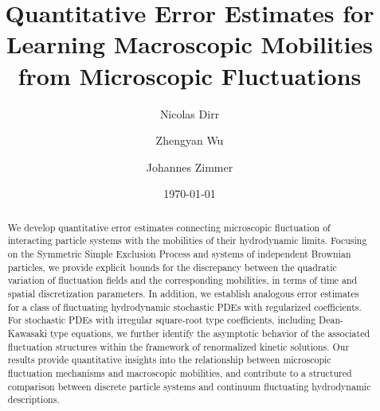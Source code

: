 \documentclass[UTF-8,reqno]{amsart}
\numberwithin{equation}{section}
\newenvironment{nouppercase}{%
  \let\uppercase\relax%
  \renewcommand{\uppercasenonmath}[1]{}}{}
\begin{document}
\title[Quantitative Error Estimates for Fluctuation Fields]
{\LARGE Quantitative Error Estimates for Learning Macroscopic Mobilities from Microscopic Fluctuations} 



\author[Nicolas Dirr]{\large Nicolas Dirr}
\address[N. Dirr]{Cardiff School of Mathematics, Cardiff University, Cardiff, UK}

\author[Zhengyan Wu]{\large Zhengyan Wu}
\address[Z. Wu]{Department of Mathematics, Technische Universit\"at M\"unchen, Boltzmannstr. 3, 85748 Garching, Germany}


\author[Johannes Zimmer]{\large Johannes Zimmer}
\address[J. Zimmer]{Department of Mathematics, Technische Universit\"at M\"unchen, Boltzmannstr. 3, 85748 Garching, Germany}





\begin{abstract}
We develop quantitative error estimates connecting microscopic fluctuation of interacting particle systems with the mobilities of their hydrodynamic limits. Focusing on the Symmetric Simple Exclusion Process and systems of independent Brownian particles, we provide explicit bounds for the discrepancy between the quadratic variation of fluctuation fields and the corresponding mobilities, in terms of time and spatial discretization parameters. In addition, we establish analogous error estimates for a class of fluctuating hydrodynamic stochastic PDEs with regularized coefficients. For stochastic PDEs with irregular square-root type coefficients, including Dean-Kawasaki type equations, we further identify the asymptotic behavior of the associated fluctuation structures within the framework of renormalized kinetic solutions. Our results provide quantitative insights into the relationship between microscopic fluctuation mechanisms and macroscopic mobilities, and contribute to a structured comparison between discrete particle systems and continuum fluctuating hydrodynamic descriptions.
\end{abstract}


\keywords{}

\date{\today}

\begin{nouppercase}
\maketitle
\end{nouppercase}
\end{document}
